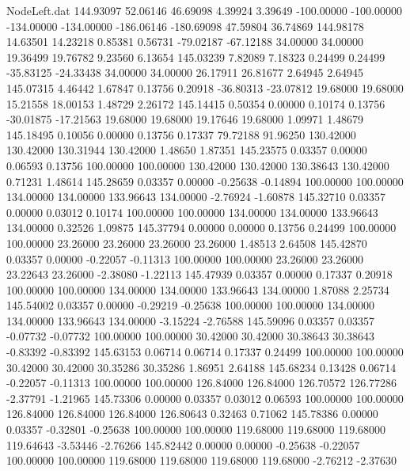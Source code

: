 \begin{filecontents}{NodeLeft.dat}
 144.93097   52.06146   46.69098     4.39924    3.39649 -100.00000 -100.00000 -134.00000 -134.00000 -186.06146 -180.69098   47.59804   36.74869
 144.98178   14.63501   14.23218     0.85381    0.56731  -79.02187  -67.12188   34.00000   34.00000   19.36499   19.76782    9.23560    6.13654
 145.03239    7.82089    7.18323     0.24499    0.24499  -35.83125  -24.33438   34.00000   34.00000   26.17911   26.81677    2.64945    2.64945
 145.07315    4.46442    1.67847     0.13756    0.20918  -36.80313  -23.07812   19.68000   19.68000   15.21558   18.00153    1.48729    2.26172
 145.14415    0.50354    0.00000     0.10174    0.13756  -30.01875  -17.21563   19.68000   19.68000   19.17646   19.68000    1.09971    1.48679
 145.18495    0.10056    0.00000     0.13756    0.17337   79.72188   91.96250  130.42000  130.42000  130.31944  130.42000    1.48650    1.87351
 145.23575    0.03357    0.00000     0.06593    0.13756  100.00000  100.00000  130.42000  130.42000  130.38643  130.42000    0.71231    1.48614
 145.28659    0.03357    0.00000    -0.25638   -0.14894  100.00000  100.00000  134.00000  134.00000  133.96643  134.00000   -2.76924   -1.60878
 145.32710    0.03357    0.00000     0.03012    0.10174  100.00000  100.00000  134.00000  134.00000  133.96643  134.00000    0.32526    1.09875
 145.37794    0.00000    0.00000     0.13756    0.24499  100.00000  100.00000   23.26000   23.26000   23.26000   23.26000    1.48513    2.64508
 145.42870    0.03357    0.00000    -0.22057   -0.11313  100.00000  100.00000   23.26000   23.26000   23.22643   23.26000   -2.38080   -1.22113
 145.47939    0.03357    0.00000     0.17337    0.20918  100.00000  100.00000  134.00000  134.00000  133.96643  134.00000    1.87088    2.25734
 145.54002    0.03357    0.00000    -0.29219   -0.25638  100.00000  100.00000  134.00000  134.00000  133.96643  134.00000   -3.15224   -2.76588
 145.59096    0.03357    0.03357    -0.07732   -0.07732  100.00000  100.00000   30.42000   30.42000   30.38643   30.38643   -0.83392   -0.83392
 145.63153    0.06714    0.06714     0.17337    0.24499  100.00000  100.00000   30.42000   30.42000   30.35286   30.35286    1.86951    2.64188
 145.68234    0.13428    0.06714    -0.22057   -0.11313  100.00000  100.00000  126.84000  126.84000  126.70572  126.77286   -2.37791   -1.21965
 145.73306    0.00000    0.03357     0.03012    0.06593  100.00000  100.00000  126.84000  126.84000  126.84000  126.80643    0.32463    0.71062
 145.78386    0.00000    0.03357    -0.32801   -0.25638  100.00000  100.00000  119.68000  119.68000  119.68000  119.64643   -3.53446   -2.76266
 145.82442    0.00000    0.00000    -0.25638   -0.22057  100.00000  100.00000  119.68000  119.68000  119.68000  119.68000   -2.76212   -2.37630

\end{filecontents}
